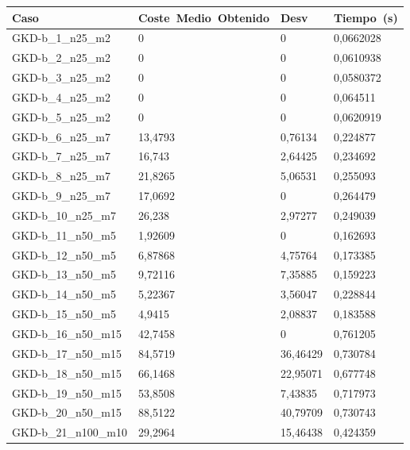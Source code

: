 \pagebreak

\begin{table}[!ht]%
    \centering    
    \begin{adjustbox}{height=12cm}
    \begin{tabular}{|l|l|l|l|}
    \hline
        Caso & Coste~Medio~Obtenido & Desv & Tiempo~(s) \\ \hline
		GKD-b\_1\_n25\_m2    & 0       & 0         & 0,0662028 \\ \hline
		GKD-b\_2\_n25\_m2    & 0       & 0         & 0,0610938 \\ \hline
		GKD-b\_3\_n25\_m2    & 0       & 0         & 0,0580372 \\ \hline
		GKD-b\_4\_n25\_m2    & 0       & 0         & 0,064511  \\ \hline
		GKD-b\_5\_n25\_m2    & 0       & 0         & 0,0620919 \\ \hline
		GKD-b\_6\_n25\_m7    & 13,4793 & 0,76134   & 0,224877  \\ \hline
		GKD-b\_7\_n25\_m7    & 16,743  & 2,64425   & 0,234692  \\ \hline
		GKD-b\_8\_n25\_m7    & 21,8265 & 5,06531   & 0,255093  \\ \hline
		GKD-b\_9\_n25\_m7    & 17,0692 & 0    & 0,264479  \\ \hline
		GKD-b\_10\_n25\_m7   & 26,238  & 2,97277   & 0,249039  \\ \hline
		GKD-b\_11\_n50\_m5   & 1,92609 & 0    & 0,162693  \\ \hline
		GKD-b\_12\_n50\_m5   & 6,87868 & 4,75764   & 0,173385  \\ \hline
		GKD-b\_13\_n50\_m5   & 9,72116 & 7,35885   & 0,159223  \\ \hline
		GKD-b\_14\_n50\_m5   & 5,22367 & 3,56047   & 0,228844  \\ \hline
		GKD-b\_15\_n50\_m5   & 4,9415  & 2,08837   & 0,183588  \\ \hline
		GKD-b\_16\_n50\_m15  & 42,7458 & 0     & 0,761205  \\ \hline
		GKD-b\_17\_n50\_m15  & 84,5719 & 36,46429  & 0,730784  \\ \hline
		GKD-b\_18\_n50\_m15  & 66,1468 & 22,95071  & 0,677748  \\ \hline
		GKD-b\_19\_n50\_m15  & 53,8508 & 7,43835   & 0,717973  \\ \hline
		GKD-b\_20\_n50\_m15  & 88,5122 & 40,79709  & 0,730743  \\ \hline
		GKD-b\_21\_n100\_m10 & 29,2964 & 15,46438  & 0,424359  \\ \hline

\end{tabular}
\end{adjustbox}
\end{table}
